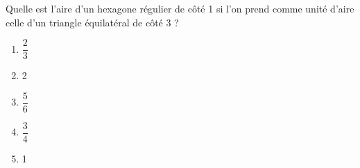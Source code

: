 Quelle est l'aire d'un hexagone régulier de côté 1 si l'on prend comme unité d'aire celle d'un triangle équilatéral de côté 3 ?
\begin{multicols}{5}
  \begin{enumerate}[A/]
  \item $\dfrac23$
  \item 2
  \item $\dfrac56$
  \item $\dfrac34$
  \item 1
  \end{enumerate}
\end{multicols}